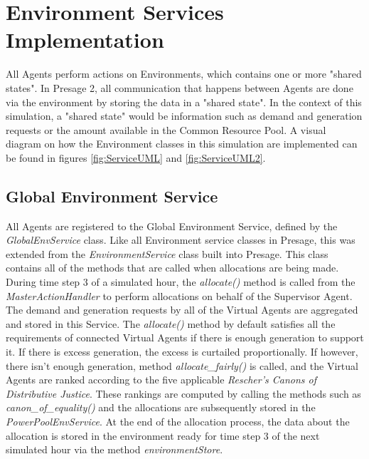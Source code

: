 \clearpage
\section*{Environment Services Implementation}
All Agents perform actions on Environments, which contains one or more "shared states". In Presage 2, all communication that happens between Agents are done via the environment by storing the data in a "shared state". In the context of this simulation, a "shared state" would be information such as demand and generation requests or the amount available in the Common Resource Pool. A visual diagram on how the Environment classes in this simulation are implemented can be found in figures \ref{fig:ServiceUML} and \ref{fig:ServiceUML2}.

\subsection*{Global Environment Service}
All Agents are registered to the Global Environment Service, defined by the \textit{GlobalEnvService} class. Like all Environment service classes in Presage, this was extended from the \textit{EnvironmentService} class built into Presage. This class contains all of the methods that are called when allocations are being made. During time step 3 of a simulated hour, the \textit{allocate()} method is called from the \textit{MasterActionHandler} to perform allocations on behalf of the Supervisor Agent. The demand and generation requests by all of the Virtual Agents are aggregated and stored in this Service. The \textit{allocate()} method by default satisfies all the requirements of connected Virtual Agents if there is enough generation to support it. If there is excess generation, the excess is curtailed proportionally. 
If however, there isn't enough generation, method \textit{allocate\_fairly()} is called, and the Virtual Agents are ranked according to the five applicable \textit{Rescher's Canons of Distributive Justice}. These rankings are computed by calling the methods such as \textit{canon\_of\_equality()} and the allocations are subsequently stored in the \textit{PowerPoolEnvService}.
At the end of the allocation process, the data about the allocation is stored in the environment ready for time step 3 of the next simulated hour via the method \textit{environmentStore}.

